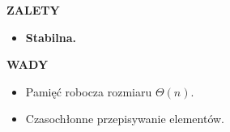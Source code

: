 \documentclass[advanced-sorts.tex]{subfiles}
\begin{document}
    \textbf{ZALETY}
    \begin{itemize}
        \item \textbf{Stabilna.}
    \end{itemize}

    \textbf{WADY}
    \begin{itemize}
        \item Pamięć robocza rozmiaru $\Theta(n)$.
        \item Czasochłonne przepisywanie elementów.
    \end{itemize}

\end{document}
